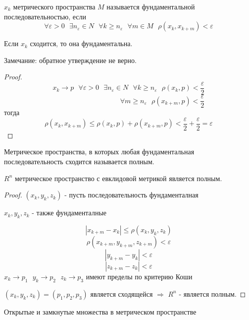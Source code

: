 \begin{define}
  $x_k$ метрического пространства $M$ называется фундаментальной
  последовательностью, если
  $$
  \forall \varepsilon > 0 ~~~ \exists n_{\varepsilon} \in N ~~~
  \forall k \ge n_{\varepsilon} ~~~ \forall m \in M ~~~ \rho(x_k, x_{k+m}) <
  \varepsilon
  $$
\end{define}

\begin{theorem}
  Если $x_k$ сходится, то она фундаментальна.

  Замечание: обратное утверждение не верно.
\end{theorem}

\begin{proof}
  $$
  x_k \to p ~~~ \forall \varepsilon > 0 ~~~ \exists n_{\varepsilon} \in N ~~~
  \forall k \ge n_{\varepsilon} ~~~ \rho(x_k, p) < \frac{\varepsilon}{2}
  $$
  $$
  ~~~~~~~~~~~~~~~~~~~~~~~~~~~~~~~~~~~~~~~~~~~~
  \forall m \ge n_{\varepsilon} ~~~ \rho(x_{k + m}, p) < \frac{\varepsilon}{2}
  $$
  тогда
  $$
  \rho(x_k, x_{k+m}) \le \rho(x_k, p) + \rho(x_{k+m}, p)
  < \frac{\varepsilon}{2} + \frac{\varepsilon}{2} = \varepsilon
  $$
\end{proof}

\begin{define}
  Метрическое пространства, в которых любая фундаментальная последовательность
  сходится называется полным.
\end{define}

\begin{theorem}
  $R^n$ метрическое пространство с евклидовой метрикой является полным.
\end{theorem}

\begin{proof}
  $(x_k, y_k, z_k)$ - пусть последовательность фундаменталная

  $x_k, y_k, z_k$ - также фундаменталные

  $$
  |x_{k+m} - x_k| \le \rho(x_k, y_k, z_k)
  $$
  $$
  \rho(x_{k+m}, y_{k+m}, z_{k+m}) < \varepsilon
  $$
  $$
  |y_{k+m} - y_k| < \varepsilon
  $$
  $$
  |z_{k+m} - z_k| < \varepsilon
  $$
  $x_k \to p_1 ~~~ y_k \to p_2 ~~~ z_k \to p_3$ имеют пределы по критерию Коши

  $(x_k, y_k, z_k) = (p_1, p_2, p_3)$ является сходящейся $\Rightarrow$ $R^n$
  - является полным.
\end{proof}

\begin{title}[\Large]
  Открытые и замкнутые множества в метрическом пространстве
\end{title}

